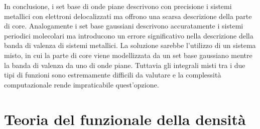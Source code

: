 \documentclass[oneside]{amsbook}
\numberwithin{section}{chapter}
\numberwithin{equation}{section}
\numberwithin{figure}{section}
\begin{document}
In conclusione, i set base di onde piane descrivono con precisione i sistemi metallici con elettroni delocalizzati ma offrono una scarsa descrizione della parte di core. Analogamente i set base gaussiani descrivono accuratamente i sistemi periodici molecolari ma introducono un errore significativo nella descrizione della banda di valenza di sistemi metallici.
La soluzione sarebbe l'utilizzo di un sistema misto, in cui la parte di core viene modellizzata da un set base gaussiano mentre la banda di valenza da uno di onde piane. Tuttavia gli integrali misti tra i due tipi di funzioni sono estremamente difficili da valutare e la complessità computazionale rende impraticabile quest'opzione.


\chapter{Teoria del funzionale della densità}
\end{document}
